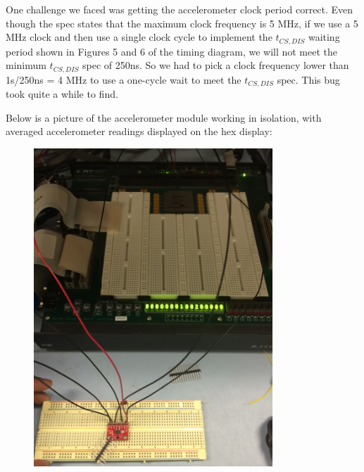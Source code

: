 \documentclass{article}
\begin{document}
One challenge we faced was getting the accelerometer clock period correct. Even though the spec states that the maximum clock frequency is 5 MHz, if we use a 5 MHz clock and then use a single clock cycle to implement the $t_{CS,DIS}$ waiting period shown in Figures 5 and 6 of the timing diagram, we will not meet the minimum $t_{CS,DIS}$ spec of 250ns. So we had to pick a clock frequency lower than 1s/250ns = 4 MHz to use a one-cycle wait to meet the $t_{CS,DIS}$ spec. This bug took quite a while to find.

Below is a picture of the accelerometer module working in isolation, with averaged accelerometer readings displayed on the hex display:
\begin{center}
\begin{figure}[H]
\includegraphics[width=0.8\textwidth, angle=270]{./img/accel-complete}
\end{figure}
\end{center}
\end{document}
